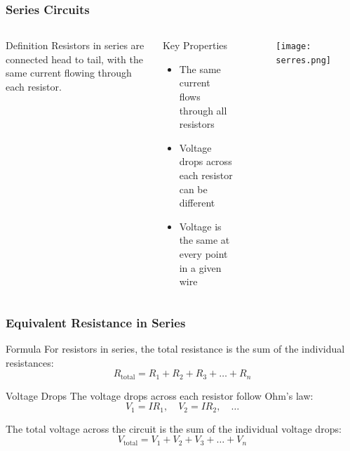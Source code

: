 \documentclass{beamer}
\begin{document}
\begin{frame}
    \frametitle{Series Circuits}
    \begin{columns}
        \begin{block}{Definition}
            Resistors in series are connected head to tail, with the same current flowing through each resistor.
        \end{block}
        
        \begin{block}{Key Properties}
            \begin{itemize}
                \item The same current flows through all resistors
                \item Voltage drops across each resistor can be different
                \item Voltage is the same at every point in a given wire
            \end{itemize}
        \end{block}
        
        \begin{alertblock}{ }
           \begin{figure}
               \centering
               \texttt{[image: serres.png]}
           \end{figure}
        \end{alertblock}
    \end{columns}
\end{frame}

\begin{frame}
    \frametitle{Equivalent Resistance in Series}
    \begin{block}{Formula}
        For resistors in series, the total resistance is the sum of the individual resistances:
        \begin{equation}
            R_{\text{total}} = R_1 + R_2 + R_3 + \ldots + R_n
        \end{equation}
    \end{block}
    
    \begin{block}{Voltage Drops}
        The voltage drops across each resistor follow Ohm's law:
        \begin{equation}
            V_1 = IR_1, \quad V_2 = IR_2, \quad \ldots
        \end{equation}
        
        The total voltage across the circuit is the sum of the individual voltage drops:
        \begin{equation}
            V_{\text{total}} = V_1 + V_2 + V_3 + \ldots + V_n
        \end{equation}
    \end{block}
\end{frame}
\end{document}
